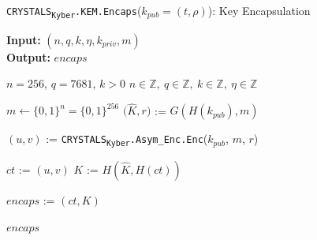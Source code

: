 \documentclass[runningheads]{llncs}
\numberwithin{equation}{section}
\begin{document}
    \vspace{-3.4ex}
    \begin{algorithm}
        \caption{\texorpdfstring{\texttt{CRYSTALS}\textsubscript{\texttt{Kyber}}\texttt{.KEM}\texttt{.Encaps}(${k}_{pub} = (t, \rho)$)}\/: Key Encapsulation}
        \label{subrou:crystals-kyber-asymmetric-encryption-encaps}
        
        \textbf{Input:} $\left( n, q, k, \eta, {k}_{priv}, m \right)$\\
        \textbf{Output:} $ encaps $
  
        \begin{algorithmic}[1]
            \Require $n = 256$, $q = 7681$, $k > 0$
            \Ensure $n \in \mathbb{Z},\ q \in \mathbb{Z},\ k \in \mathbb{Z},\ \eta \in \mathbb{Z}$
            
            \vspace{2ex}
            
            \State $m \gets { \{ 0 , 1 \} }^{n} = { \{ 0 , 1 \} }^{256}$
            \State $\big( \hat{K}, r \big)$ := $G( H( {k}_{pub} ) , m )$
            
            \vspace{1ex}

            \State $\left( u, v \right)$ := \texorpdfstring{\texttt{CRYSTALS}\textsubscript{\texttt{Kyber}}\texttt{.Asym\_Enc}\texttt{.Enc}}\/(${k}_{pub}$, $m$, $r$)
            
            \vspace{1ex}

            \State $ct$ := $(u, v)$
            \State $K$ := $H(\hat{K}, H(ct))$
            
            \vspace{1ex}

            \State $encaps$ := $(ct, K)$
            
            \vspace{1ex}
            
            \State \Return $encaps$
        \end{algorithmic}
    \end{algorithm}

    \newpage 
    
\end{document}
